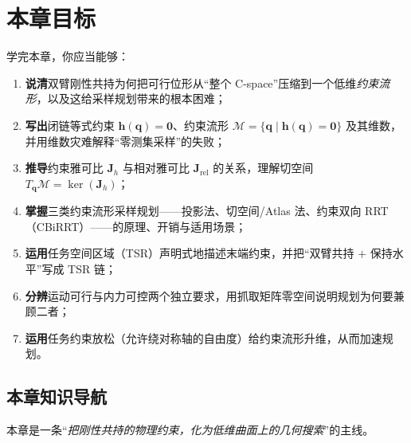 \section*{本章目标}
学完本章，你应当能够：
\begin{enumerate}
  \item \textbf{说清}双臂刚性共持为何把可行位形从“整个 C-space”压缩到一个低维\emph{约束流形}，以及这给采样规划带来的根本困难；
  \item \textbf{写出}闭链等式约束 $\mathbf{h}(\mathbf{q})=\mathbf{0}$、约束流形 $\mathcal{M}=\{\mathbf{q}\mid\mathbf{h}(\mathbf{q})=\mathbf{0}\}$ 及其维数，并用维数灾难解释“零测集采样”的失败；
  \item \textbf{推导}约束雅可比 $\mathbf{J}_h$ 与相对雅可比 $\mathbf{J}_{\text{rel}}$ 的关系，理解切空间 $T_{\mathbf{q}}\mathcal{M}=\ker(\mathbf{J}_h)$；
  \item \textbf{掌握}三类约束流形采样规划——投影法、切空间/Atlas 法、约束双向 RRT（CBiRRT）——的原理、开销与适用场景；
  \item \textbf{运用}任务空间区域（TSR）声明式地描述末端约束，并把“双臂共持 $+$ 保持水平”写成 TSR 链；
  \item \textbf{分辨}运动可行与内力可控两个独立要求，用抓取矩阵零空间说明规划为何要兼顾二者；
  \item \textbf{运用}任务约束放松（允许绕对称轴的自由度）给约束流形升维，从而加速规划。
\end{enumerate}

\subsection*{本章知识导航}
本章是一条“\emph{把刚性共持的物理约束，化为低维曲面上的几何搜索}”的主线。

